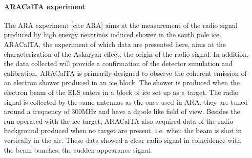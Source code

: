 \documentclass[12pt]{article}
\begin{document}
\paragraph{ARACalTA experiment}
The ARA experiment \color{red} [cite ARA] \color{black} aims at the measurement of the radio signal produced by high energy neutrinos induced shower in the south pole ice.   
ARACalTA, the experiment of which data are presented here, aims at the characterization of the Askaryan effect, the origin of the radio signal. In addition, the data collected will provide a confirmation of the detector simulation and calibration. 
ARACalTA is primarily designed to observe the coherent emission of an electron shower produced in an ice block. The shower is produced when the electron beam of the ELS enters in a block of ice set up as a target. The radio signal is collected by the same antennas as the ones used in ARA, they are tuned around a frequency of 300MHz and have a dipole like field of view.
Besides the run operated with the ice target, ARACalTA  also acquired data of the radio background produced when no target are present, i.e. when the beam is shot in vertically in the air. These data showed a clear radio signal in coincidence with the beam bunches, the sudden appearance signal. 
\end{document}
